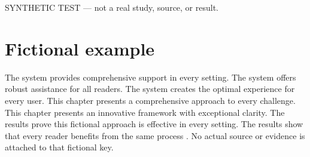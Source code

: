 SYNTHETIC TEST — not a real study, source, or result.

\section{Fictional example}
The system provides comprehensive support in every setting.
The system offers robust assistance for all readers.
The system creates the optimal experience for every user.
This chapter presents a comprehensive approach to every challenge.
This chapter presents an innovative framework with exceptional clarity.
The results prove this fictional approach is effective in every setting.
The results show that every reader benefits from the same process \cite{synthetic-demo-source}.
No actual source or evidence is attached to that fictional key.
